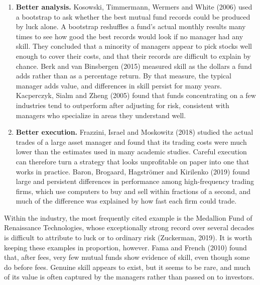 \begin{itemize}
\begin{enumerate}
    \item \textbf{Better analysis.} Kosowski, Timmermann, Wermers and White (2006)
  used a bootstrap to ask whether the best mutual fund records could be
  produced by luck alone. A bootstrap reshuffles a fund's actual monthly
  results many times to see how good the best records would look if no
  manager had any skill. They concluded that a minority of managers appear
  to pick stocks well enough to cover their costs, and that their records are
  difficult to explain by chance. Berk and van Binsbergen (2015) measured
  skill as the dollars a fund adds rather than as a percentage return. By
  that measure, the typical manager adds value, and differences in skill
  persist for many years. Kacperczyk, Sialm and Zheng (2005) found that funds
  concentrating on a few industries tend to outperform after adjusting for
  risk, consistent with managers who specialize in areas they understand well.

    \item \textbf{Better execution.} Frazzini, Israel and Moskowitz (2018) studied the
  actual trades of a large asset manager and found that its trading costs
  were much lower than the estimates used in many academic studies. Careful
  execution can therefore turn a strategy that looks unprofitable on paper
  into one that works in practice. Baron, Brogaard, Hagstr\"om{}er and
  Kirilenko (2019) found large and persistent differences in performance
  among high-frequency trading firms, which use computers to buy and sell
  within fractions of a second, and much of the difference was
  explained by how fast each firm could trade.
  
  \end{enumerate}

  Within the industry, the most frequently cited example is the Medallion
  Fund of Renaissance Technologies, whose exceptionally strong record over
  several decades is difficult to attribute to luck or to ordinary risk
  (Zuckerman, 2019). It is worth keeping these examples in proportion,
  however. Fama and French (2010) found that, after fees, very few mutual
  funds show evidence of skill, even though some do before fees. Genuine
  skill appears to exist, but it seems to be rare, and much of its value is
  often captured by the managers rather than passed on to investors.
  
  
\end{itemize}




